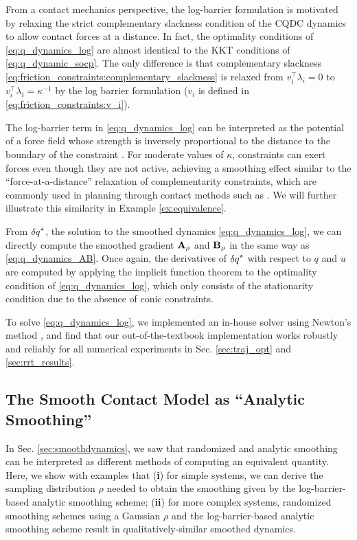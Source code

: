 From a contact mechanics perspective, the log-barrier formulation is motivated by relaxing the strict complementary slackness condition of the CQDC dynamics to allow contact forces at a distance. In fact, the optimality conditions of \eqref{eq:q_dynamics_log} are almost identical to the KKT conditions of \eqref{eq:q_dynamic_socp}. The only difference is that complementary slackness \eqref{eq:friction_constraints:complementary_slackness} is relaxed from $v_i^\intercal \lambda_i = 0$ to $v_i^\intercal \lambda_i = \kappa^{-1}$ by the log barrier formulation ($v_i$ is defined in \eqref{eq:friction_constraints:v_i}).

The log-barrier term in \eqref{eq:q_dynamics_log} can be interpreted as the potential of a force field whose strength is inversely proportional to the distance to the boundary of the constraint \cite[p.567]{boyd2004convex}. For moderate values of $\kappa$, constraints can exert forces even though they are not active, achieving a smoothing effect similar to the ``force-at-a-distance'' relaxation of complementarity constraints, which are commonly used in planning through contact methods such as \cite{posa2014direct, howell2022dojo}. We will further illustrate this similarity in Example \ref{ex:equivalence}.

From ${\delta q}^\star$, the solution to the smoothed dynamics \eqref{eq:q_dynamics_log}, we can directly compute the smoothed gradient $\mathbf{A}_\rho$ and $\mathbf{B}_\rho$ in the same way as \eqref{eq:q_dynamics_AB}. Once again, the derivatives of ${\delta q}^\star$ with respect to $q$ and $u$ are computed by applying the implicit function theorem to the optimality condition of \eqref{eq:q_dynamics_log}, which only consists of the stationarity condition due to the absence of conic constraints.

To solve \eqref{eq:q_dynamics_log}, we implemented an in-house solver using Newton's method \cite[]{boyd2004convex}, and find that our out-of-the-textbook implementation works robustly and reliably for all numerical experiments in Sec. \ref{sec:traj_opt} and \ref{sec:rrt_results}.


\subsection{The Smooth Contact Model as ``Analytic Smoothing''} \label{sec:smoothing_equivalence}
In Sec. \ref{sec:smoothdynamics}, we saw that randomized and analytic smoothing can be interpreted as different methods of computing an equivalent quantity. Here, we show with examples that (\textbf{i}) for simple systems, we can derive the sampling distribution $\rho$ needed to obtain the smoothing given by the log-barrier-based analytic smoothing scheme; (\textbf{ii}) for more complex systems, randomized smoothing schemes using a Gaussian $\rho$ and the log-barrier-based analytic smoothing scheme result in qualitatively-similar smoothed dynamics.

